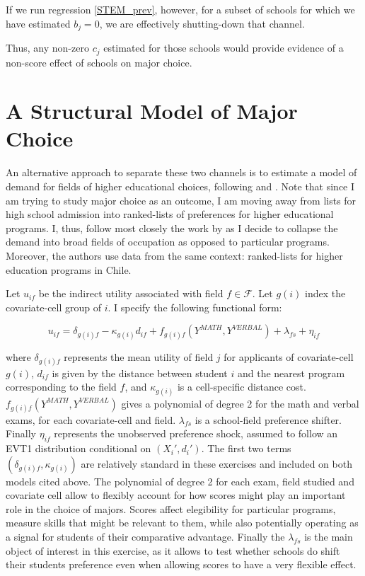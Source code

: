 \documentclass[a4paper, article, english, oneside, unknownkeysallowed, 12pt]{memoir}
\begin{document}
If we run regression \ref{STEM_prev}, however, for a subset of schools for which we have estimated $b_j = 0$, we are effectively shutting-down that channel. 

Thus, any non-zero $c_j$ estimated  for those schools would provide evidence of a non-score effect of schools on major choice.


\section{A Structural Model of Major Choice}

An alternative approach to separate these two channels is to estimate a model of demand for fields of higher educational choices, following \textcite{abdulkadiroglu_parents_2020} and \textcite{campos_college_2026}. 
Note that since I am trying to study major choice as an outcome, I am moving away from lists for high school admission into ranked-lists of preferences for higher educational programs. 
I, thus, follow most closely the work by \textcite{campos_college_2026} as I decide to collapse the demand into broad fields of occupation as opposed to particular programs. Moreover, the authors use data from the same context: ranked-lists for higher education programs in Chile.


Let $u_{if}$ be the indirect utility associated with field $f \in \mathcal{F}$. Let $g(i)$ index the covariate-cell group of $i$. 
I specify the following functional form: 

\begin{equation}
  u_{if} = \delta_{g(i)f} - \kappa_{g(i)} d_{if} + f_{g(i)f}(Y^{MATH}, Y^{VERBAL}) + \lambda_{fs} + \eta_{if}  
\end{equation}

where $\delta_{g(i)f}$ represents the mean utility of field $j$ for applicants of covariate-cell $g(i)$, $d_{if}$ is given by the distance between student $i$ and the nearest program corresponding to the field $f$, and $\kappa_{g(i)}$ is a cell-specific distance cost. 
$f_{g(i)f}(Y^{MATH}, Y^{VERBAL})$ gives a polynomial of degree 2 for the math and verbal exams, for each covariate-cell and field. $\lambda_{fs}$ is a school-field preference shifter. Finally $\eta_{if}$ represents the unobserved preference shock, assumed to follow an EVT1 distribution conditional on $(X_i', d_i')$. 
The first two terms $(\delta_{g(i)f}, \kappa_{g(i)})$ are relatively standard in these exercises and included on both models cited above. 
The polynomial of degree 2 for each exam, field studied and covariate cell allow to flexibly account for how scores might play an important role in the choice of majors. Scores affect elegibility for particular programs, measure skills that might be relevant to them, while also potentially operating as a signal for students of their comparative advantage.  
Finally the $\lambda_{fs}$ is the main object of interest in this exercise, as it allows to test whether schools do shift their students preference even when allowing scores to have a very flexible effect.
\end{document}

